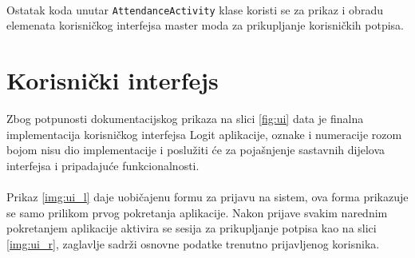 \paragraph*{}
Ostatak koda unutar \texttt{AttendanceActivity} klase koristi se za prikaz i obradu elemenata korisničkog interfejsa master moda za prikupljanje korisničkih potpisa.

\section{Korisnički interfejs}
Zbog potpunosti dokumentacijskog prikaza na slici \ref{fig:ui} data je finalna implementacija korisničkog interfejsa Logit aplikacije, oznake i numeracije rozom bojom nisu dio implementacije i poslužiti će za pojašnjenje sastavnih dijelova interfejsa i pripadajuće funkcionalnosti.

\paragraph*{}
Prikaz \ref{img:ui_l} daje uobičajenu formu za prijavu na sistem, ova forma prikazuje se samo prilikom prvog pokretanja aplikacije. Nakon prijave svakim narednim pokretanjem aplikacije aktivira se sesija za prikupljanje potpisa kao na slici \ref{img:ui_r}, zaglavlje sadrži osnovne podatke trenutno prijavljenog korisnika.

